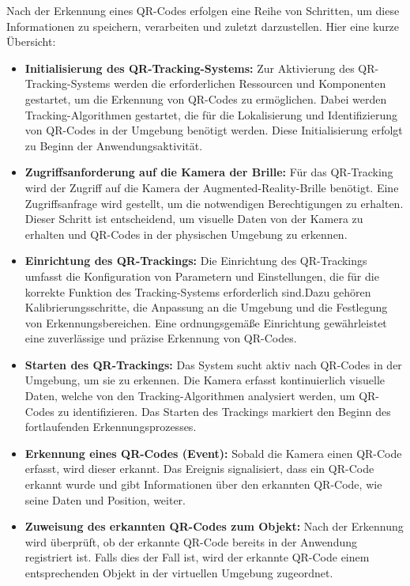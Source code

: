 Nach der Erkennung eines QR-Codes erfolgen eine Reihe von Schritten, um diese Informationen zu speichern, verarbeiten
und zuletzt darzustellen.
Hier eine kurze Übersicht:
\begin{itemize}

\item \textbf{Initialisierung des QR-Tracking-Systems:}
Zur Aktivierung des QR-Tracking-Systems werden die erforderlichen Ressourcen und Komponenten gestartet, um die Erkennung
von QR-Codes zu ermöglichen. Dabei werden Tracking-Algorithmen gestartet, die für die Lokalisierung und Identifizierung
von QR-Codes in der Umgebung benötigt werden. Diese Initialisierung erfolgt zu Beginn der Anwendungsaktivität.

\item \textbf{Zugriffsanforderung auf die Kamera der Brille:}
Für das QR-Tracking wird der Zugriff auf die Kamera der Augmented-Reality-Brille benötigt. Eine Zugriffsanfrage wird
gestellt, um die notwendigen Berechtigungen zu erhalten. Dieser Schritt ist entscheidend, um visuelle Daten von der Kamera
zu erhalten und QR-Codes in der physischen Umgebung zu erkennen.

\item \textbf{Einrichtung des QR-Trackings:}
Die Einrichtung des QR-Trackings umfasst die Konfiguration von Parametern und Einstellungen, die für die korrekte
Funktion des Tracking-Systems erforderlich sind.Dazu gehören Kalibrierungsschritte, die Anpassung an die Umgebung und die
Festlegung von Erkennungsbereichen. Eine ordnungsgemäße Einrichtung gewährleistet eine zuverlässige und präzise Erkennung von QR-Codes.

\item \textbf{Starten des QR-Trackings:}
Das System sucht aktiv nach QR-Codes in der Umgebung, um sie zu erkennen. Die Kamera erfasst kontinuierlich visuelle
Daten, welche von den Tracking-Algorithmen analysiert werden, um QR-Codes zu identifizieren. Das Starten des Trackings
markiert den Beginn des fortlaufenden Erkennungsprozesses.

\item \textbf{Erkennung eines QR-Codes (Event):}
Sobald die Kamera einen QR-Code erfasst, wird dieser erkannt. Das Ereignis signalisiert, dass ein QR-Code erkannt wurde
und gibt Informationen über den erkannten QR-Code, wie seine Daten und Position, weiter.

\item \textbf{Zuweisung des erkannten QR-Codes zum Objekt:}
Nach der Erkennung wird überprüft, ob der erkannte QR-Code bereits in der Anwendung registriert ist. Falls dies der Fall
ist, wird der erkannte QR-Code einem entsprechenden Objekt in der virtuellen Umgebung zugeordnet.


\end{itemize}
